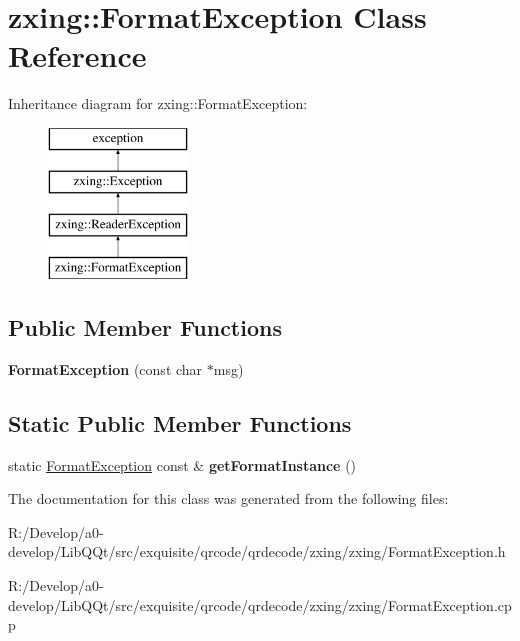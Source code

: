 \hypertarget{classzxing_1_1_format_exception}{}\section{zxing\+:\+:Format\+Exception Class Reference}
\label{classzxing_1_1_format_exception}
Inheritance diagram for zxing\+:\+:Format\+Exception\+:\begin{figure}[H]
\begin{center}
\leavevmode
\includegraphics[height=4.000000cm]{classzxing_1_1_format_exception}
\end{center}
\end{figure}
\subsection*{Public Member Functions}
\begin{DoxyCompactItemize}
\item 
\mbox{\label{classzxing_1_1_format_exception_aede4e88b8ce59da9a3998dd75f55ffb8}} 
{\bfseries Format\+Exception} (const char $\ast$msg)
\end{DoxyCompactItemize}
\subsection*{Static Public Member Functions}
\begin{DoxyCompactItemize}
\item 
\mbox{\label{classzxing_1_1_format_exception_ad89fa13f52ddf5da16fcb15d59d03b58}} 
static \mbox{\hyperlink{classzxing_1_1_format_exception}{Format\+Exception}} const  \& {\bfseries get\+Format\+Instance} ()
\end{DoxyCompactItemize}


The documentation for this class was generated from the following files\+:\begin{DoxyCompactItemize}
\item 
R\+:/\+Develop/a0-\/develop/\+Lib\+Q\+Qt/src/exquisite/qrcode/qrdecode/zxing/zxing/Format\+Exception.\+h\item 
R\+:/\+Develop/a0-\/develop/\+Lib\+Q\+Qt/src/exquisite/qrcode/qrdecode/zxing/zxing/Format\+Exception.\+cpp\end{DoxyCompactItemize}
